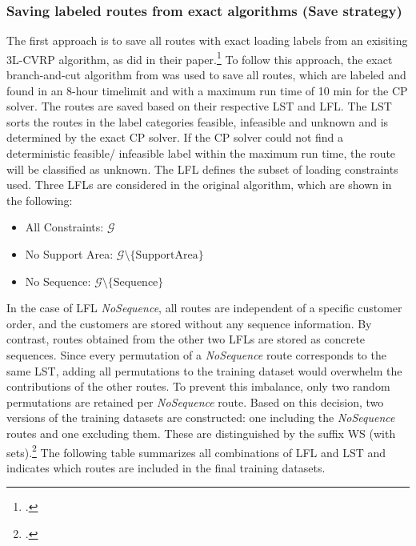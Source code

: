 \subsubsection{Saving labeled routes from exact algorithms (Save strategy)}
The first approach is to save all routes with exact loading labels from an exisiting \gls{3L-CVRP}
algorithm, as \cite{zhang_learning-based_2022} did in their paper.\footcite[cf.][]{zhang_learning-based_2022}
To follow this approach, the exact branch-and-cut algorithm from \cite{tamke_branch-and-cut_2024} was
used to save all routes, which are labeled and found in an 8-hour timelimit and with a maximum run time of 10 min for the \gls{CP} solver.
The routes are saved based on their respective \gls{LST} and \gls{LFL}. The \gls{LST} sorts the routes in the
label categories feasible, infeasible and unknown and is determined by the exact \gls{CP} solver.
If the \gls{CP} solver could not find a deterministic feasible/ infeasible label within the maximum run time, the route
will be classified as unknown. The \gls{LFL} defines the subset of
loading constraints used. Three \glspl{LFL} are considered in the original algorithm, which are shown
in the following:
\begin{itemize}
    \item All Constraints: $\mathcal{G}$
    \item No Support Area: $\mathcal{G}\setminus \{\text{SupportArea}\}$
    \item No Sequence: $\mathcal{G}\setminus \{\text{Sequence}\}$
\end{itemize}
In the case of \gls{LFL} \textit{NoSequence}, all routes are independent of a specific customer order, and the customers are stored
without any sequence information. By contrast, routes obtained from the other two \glspl{LFL} are stored as concrete sequences.
Since every permutation of a \textit{NoSequence} route corresponds to the same \gls{LST}, adding all permutations to the training
dataset would overwhelm the contributions of the other routes. To prevent this imbalance, only two random permutations are
retained per \textit{NoSequence} route. Based on this decision, two versions of the training datasets are constructed:
one including the \textit{NoSequence} routes and one excluding them. These are distinguished by the suffix WS (with sets).\footcites[Retrieved from][]{tamke_repository_2024}[cf.][]{tamke_branch-and-cut_2024}
The following table summarizes all combinations of \gls{LFL} and \gls{LST} and indicates which routes are included in
the final training datasets.

